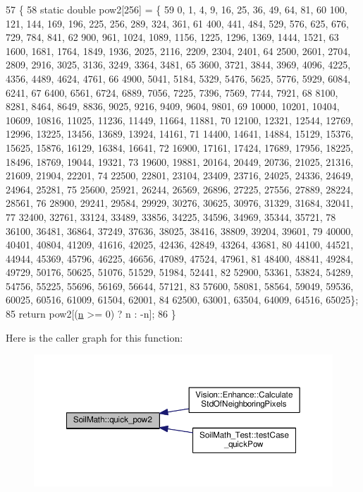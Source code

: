 \begin{DoxyCode}
57                                        \{
58   \textcolor{keyword}{static} \textcolor{keywordtype}{double} pow2[256] = \{
59       0,     1,     4,     9,     16,    25,    36,    49,    64,    81,
60       100,   121,   144,   169,   196,   225,   256,   289,   324,   361,
61       400,   441,   484,   529,   576,   625,   676,   729,   784,   841,
62       900,   961,   1024,  1089,  1156,  1225,  1296,  1369,  1444,  1521,
63       1600,  1681,  1764,  1849,  1936,  2025,  2116,  2209,  2304,  2401,
64       2500,  2601,  2704,  2809,  2916,  3025,  3136,  3249,  3364,  3481,
65       3600,  3721,  3844,  3969,  4096,  4225,  4356,  4489,  4624,  4761,
66       4900,  5041,  5184,  5329,  5476,  5625,  5776,  5929,  6084,  6241,
67       6400,  6561,  6724,  6889,  7056,  7225,  7396,  7569,  7744,  7921,
68       8100,  8281,  8464,  8649,  8836,  9025,  9216,  9409,  9604,  9801,
69       10000, 10201, 10404, 10609, 10816, 11025, 11236, 11449, 11664, 11881,
70       12100, 12321, 12544, 12769, 12996, 13225, 13456, 13689, 13924, 14161,
71       14400, 14641, 14884, 15129, 15376, 15625, 15876, 16129, 16384, 16641,
72       16900, 17161, 17424, 17689, 17956, 18225, 18496, 18769, 19044, 19321,
73       19600, 19881, 20164, 20449, 20736, 21025, 21316, 21609, 21904, 22201,
74       22500, 22801, 23104, 23409, 23716, 24025, 24336, 24649, 24964, 25281,
75       25600, 25921, 26244, 26569, 26896, 27225, 27556, 27889, 28224, 28561,
76       28900, 29241, 29584, 29929, 30276, 30625, 30976, 31329, 31684, 32041,
77       32400, 32761, 33124, 33489, 33856, 34225, 34596, 34969, 35344, 35721,
78       36100, 36481, 36864, 37249, 37636, 38025, 38416, 38809, 39204, 39601,
79       40000, 40401, 40804, 41209, 41616, 42025, 42436, 42849, 43264, 43681,
80       44100, 44521, 44944, 45369, 45796, 46225, 46656, 47089, 47524, 47961,
81       48400, 48841, 49284, 49729, 50176, 50625, 51076, 51529, 51984, 52441,
82       52900, 53361, 53824, 54289, 54756, 55225, 55696, 56169, 56644, 57121,
83       57600, 58081, 58564, 59049, 59536, 60025, 60516, 61009, 61504, 62001,
84       62500, 63001, 63504, 64009, 64516, 65025\};
85   \textcolor{keywordflow}{return} pow2[(\hyperlink{_comparision_pictures_2_createtest_image_8m_aeab71244afb687f16d8c4f5ee9d6ef0e}{n} >= 0) ? n : -n];
86 \}
\end{DoxyCode}


Here is the caller graph for this function\+:\nopagebreak
\begin{figure}[H]
\begin{center}
\leavevmode
\includegraphics[width=350pt]{namespace_soil_math_a69d186af0e164a5f98c42985aabec919_icgraph}
\end{center}
\end{figure}


